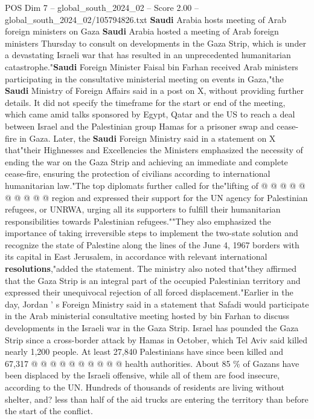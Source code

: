 \begin{textsample}{POS Dim 7 – global\_south\_2024\_02 – Score 2.00 – global\_south\_2024\_02/105794826.txt}  \label{ex:f7_pos_050}
\textbf{Saudi} Arabia hosts meeting of Arab foreign ministers on Gaza \textbf{Saudi} Arabia hosted a meeting of Arab foreign ministers Thursday to consult on developments in the Gaza Strip, which is under a devastating Israeli war that has resulted in an unprecedented humanitarian catastrophe."\textbf{Saudi} Foreign Minister Faisal bin Farhan received Arab ministers participating in the consultative ministerial meeting on events in Gaza,"the \textbf{Saudi} Ministry of Foreign Affairs said in a post on X, without providing further details.
It did not specify the timeframe for the start or end of the meeting, which came amid talks sponsored by Egypt, Qatar and the US to reach a deal between Israel and the Palestinian group Hamas for a prisoner swap and cease-fire in Gaza.
Later, the \textbf{Saudi} Foreign Ministry said in a statement on X that"their Highnesses and Excellencies the Ministers emphasized the necessity of ending the war on the Gaza Strip and achieving an immediate and complete cease-fire, ensuring the protection of civilians according to international humanitarian law."The top diplomats further called for the"lifting of @ @ @ @ @ @ @ @ @ @ region and expressed their support for the UN agency for Palestinian refugees, or UNRWA, urging all its supporters to fulfill their humanitarian responsibilities towards Palestinian refugees.""They also emphasized the importance of taking irreversible steps to implement the two-state solution and recognize the state of Palestine along the lines of the June 4, 1967 borders with its capital in East Jerusalem, in accordance with relevant international \textbf{resolutions},"added the statement.
The ministry also noted that"they affirmed that the Gaza Strip is an integral part of the occupied Palestinian territory and expressed their unequivocal rejection of all forced displacement."Earlier in the day, Jordan ' s Foreign Ministry said in a statement that Safadi would participate in the Arab ministerial consultative meeting hosted by bin Farhan to discuss developments in the Israeli war in the Gaza Strip.
Israel has pounded the Gaza Strip since a cross-border attack by Hamas in October, which Tel Aviv said killed nearly 1,200 people.
At least 27,840 Palestinians have since been killed and 67,317 @ @ @ @ @ @ @ @ @ @ health authorities.
About 85 \% of Gazans have been displaced by the Israeli offensive, while all of them are food insecure, according to the UN.
Hundreds of thousands of residents are living without shelter, and? less than half of the aid trucks are entering the territory than before the start of the conflict.

\end{textsample}
